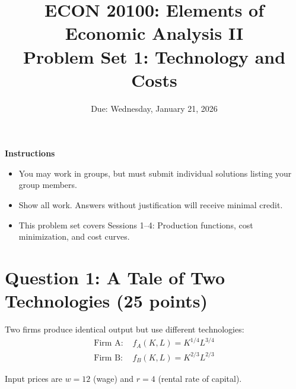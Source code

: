 \documentclass[11pt]{article}
\title{\textbf{ECON 20100: Elements of Economic Analysis II}\\
Problem Set 1: Technology and Costs}
\date{Due: Wednesday, January 21, 2026}
\author{}
\begin{document}
\maketitle

\noindent \textbf{Instructions}
\begin{itemize}
    \item You may work in groups, but must submit individual solutions listing your group members.
    \item Show all work. Answers without justification will receive minimal credit.
    \item This problem set covers Sessions 1--4: Production functions, cost minimization, and cost curves.
\end{itemize}

\section*{Question 1: A Tale of Two Technologies (25 points)}

Two firms produce identical output but use different technologies:
\begin{align*}
\text{Firm A: } & f_A(K,L) = K^{1/4}L^{3/4} \\
\text{Firm B: } & f_B(K,L) = K^{2/3}L^{2/3}
\end{align*}

Input prices are $w = 12$ (wage) and $r = 4$ (rental rate of capital).
\end{document}
